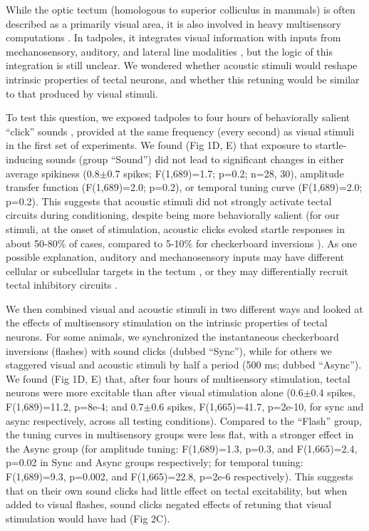 \documentclass{article}
\begin{document}
While the optic tectum (homologous to superior colliculus in mammals) is often described as a primarily visual area, it is also involved in heavy multisensory computations \citep{stein2014}. In tadpoles, it integrates visual information with inputs from mechanosensory, auditory, and lateral line modalities \citep{deeg2009,pratt2009,hiramoto2009,felch2016,truszkowski2017}, but the logic of this integration is still unclear. We wondered whether acoustic stimuli would reshape intrinsic properties of tectal neurons, and whether this retuning would be similar to that produced by visual stimuli. 

To test this question, we exposed tadpoles to four hours of behaviorally salient “click” sounds \citep{james2015,truszkowski2017}, provided at the same frequency (every second) as visual stimuli in the first set of experiments. We found (Fig 1D, E) that exposure to startle-inducing sounds (group “Sound”) did not lead to significant changes in either average spikiness (0.8$\pm$0.7 spikes; F(1,689)=1.7; p=0.2; n=28, 30), amplitude transfer function (F(1,689)=2.0; p=0.2), or temporal tuning curve (F(1,689)=2.0; p=0.2). This suggests that acoustic stimuli did not strongly activate tectal circuits during conditioning, despite being more behaviorally salient (for our stimuli, at the onset of stimulation, acoustic clicks evoked startle responses in about 50-80\% of cases, compared to 5-10\% for checkerboard inversions \citep{james2015,truszkowski2017}). As one possible explanation, auditory and mechanosensory inputs may have different cellular or subcellular targets in the tectum \citep{bollmann2009}, or they may differentially recruit tectal inhibitory circuits \citep{liu2016,hamodi2016}.

We then combined visual and acoustic stimuli in two different ways and looked at the effects of multisensory stimulation on the intrinsic properties of tectal neurons. For some animals, we synchronized the instantaneous checkerboard inversions (flashes) with sound clicks (dubbed “Sync”), while for others we staggered visual and acoustic stimuli by half a period (500 ms; dubbed “Async”). We found (Fig 1D, E) that, after four hours of multisensory stimulation, tectal neurons were more excitable than after visual stimulation alone (0.6$\pm$0.4 spikes, F(1,689)=11.2, p=8e-4; and 0.7$\pm$0.6 spikes, F(1,665)=41.7, p=2e-10, for sync and async respectively, across all testing conditions). Compared to the “Flash” group, the tuning curves in multisensory groups were less flat, with a stronger effect in the Async group (for amplitude tuning: F(1,689)=1.3, p=0.3, and F(1,665)=2.4, p=0.02 in Sync and Async groups respectively; for temporal tuning: F(1,689)=9.3, p=0.002, and F(1,665)=22.8, p=2e-6 respectively). This suggests that on their own sound clicks had little effect on tectal excitability, but when added to visual flashes, sound clicks negated effects of retuning that visual stimulation would have had (Fig 2C).
\end{document}
